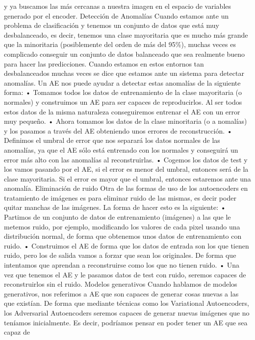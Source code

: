 \documentclass[
  a4paper,
  DIV=11,
  numbers=noendperiod]{scrreprt}
\begin{document}
y ya buscamos las más cercanas a nuestra imagen en el espacio de
variables generado por el encoder. Detección de Anomalías Cuando estamos
ante un problema de clasificación y tenemos un conjunto de datos que
está muy desbalanceado, es decir, tenemos una clase mayoritaria que es
mucho más grande que la minoritaria (posiblemente del orden de más del
95\%), muchas veces es complicado conseguir un conjunto de datos
balanceado que sea realmente bueno para hacer las predicciones. Cuando
estamos en estos entornos tan desbalanceados muchas veces se dice que
estamos ante un sistema para detectar anomalías. Un AE nos puede ayudar
a detectar estas anomalías de la siguiente forma: • Tomamos todos los
datos de entrenamiento de la clase mayoritaria (o normales) y
construimos un AE para ser capaces de reproducirlos. Al ser todos estos
datos de la misma naturaleza conseguiremos entrenar el AE con un error
muy pequeño. • Ahora tomamos los datos de la clase minoritaria (o a
nomalías) y los pasamos a través del AE obteniendo unos errores de
reconstrucción. • Definimos el umbral de error que nos separará los
datos normales de las anomalías, ya que el AE sólo está entrenado con
los normales y conseguirá un error más alto con las anomalías al
reconstruirlas. • Cogemos los datos de test y los vamos pasando por el
AE, si el error es menor del umbral, entonces será de la clase
mayoritaria. Si el error es mayor que el umbral, entonces estaremos ante
una anomalía. Eliminación de ruido Otra de las formas de uso de los
autoencoders en tratamiento de imágenes es para eliminar ruido de las
mismas, es decir poder quitar manchas de las imágenes. La forma de hacer
esto es la siguiente: • Partimos de un conjunto de datos de
entrenamiento (imágenes) a las que le metemos ruido, por ejemplo,
modificando los valores de cada pixel usando una distribución normal, de
forma que obtenemos unos datos de entrenamiento con ruido. • Construimos
el AE de forma que los datos de entrada son los que tienen ruido, pero
los de salida vamos a forzar que sean los originales. De forma que
intentamos que aprendan a reconstruirse como los que no tienen ruido. •
Una vez que tenemos el AE y le pasamos datos de test con ruido, seremos
capaces de reconstruirlos sin el ruido. Modelos generativos Cuando
hablamos de modelos generativos, nos referimos a AE que son capaces de
generar cosas nuevas a las que existían. De forma que mediante técnicas
como los Variational Autoencoders, los Adversarial Autoencoders seremos
capaces de generar nuevas imágenes que no teníamos inicialmente. Es
decir, podríamos pensar en poder tener un AE que sea capaz de
\end{document}

